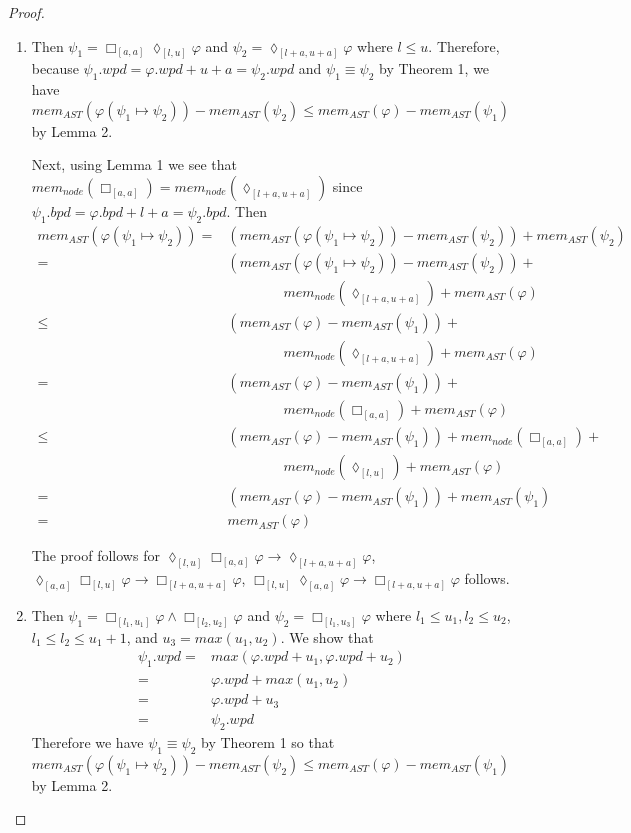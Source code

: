 \documentclass{article}
\begin{document}
\begin{proof}
\begin{enumerate}
    \item[(R3):] Then $\psi_1 = \Box_{[a,a]}{\lozenge_{[l,u]}}{\varphi}$ and $\psi_2 = \lozenge_{[l+a,u+a]}{\varphi}$ where $l \leq u$. 
Therefore, because $\psi_1.wpd = \varphi.wpd + u+a = \psi_2.wpd$ and $\psi_1 \equiv \psi_2$ by Theorem 1, we have $mem_{AST}(\varphi(\psi_1 \mapsto \psi_2)) - mem_{AST}(\psi_2)  \leq mem_{AST}(\varphi) - mem_{AST}(\psi_1)$ by Lemma 2.

Next, using Lemma 1 we see that $mem_{node}(\Box_{[a,a]}{}) = mem_{node}(\lozenge_{[l+a,u+a]}{})$ since $\psi_1.bpd = \varphi.bpd + l+a = \psi_2.bpd$. Then
\begin{align*}
mem_{AST}(\varphi(\psi_1 \mapsto \psi_2)) = & (mem_{AST}(\varphi(\psi_1 \mapsto \psi_2)) - mem_{AST}(\psi_2)) + mem_{AST}(\psi_2) \\
= & (mem_{AST}(\varphi(\psi_1 \mapsto \psi_2)) - mem_{AST}(\psi_2)) + \\
& \qquad \qquad mem_{node}(\lozenge_{[l+a,u+a]}{}) + mem_{AST}(\varphi) \\
\leq & (mem_{AST}(\varphi) - mem_{AST}(\psi_1)) + \\
& \qquad \qquad mem_{node}(\lozenge_{[l+a,u+a]}{}) + mem_{AST}(\varphi) \\
= & (mem_{AST}(\varphi) - mem_{AST}(\psi_1)) + \\
& \qquad \qquad mem_{node}(\Box_{[a,a]}{}) + mem_{AST}(\varphi) \\
\leq & (mem_{AST}(\varphi) - mem_{AST}(\psi_1)) + mem_{node}(\Box_{[a,a]}{}) + \\
& \qquad \qquad mem_{node}(\lozenge_{[l,u]}) + mem_{AST}(\varphi) \\
= & (mem_{AST}(\varphi) - mem_{AST}(\psi_1)) + mem_{AST}(\psi_1) \\
= & mem_{AST}(\varphi)
\end{align*}

The proof follows for $\lozenge_{[l,u]}{\Box_{[a,a]}}{\varphi} \rightarrow \lozenge_{[l+a,u+a]}{\varphi}$, $\lozenge_{[a,a]}{\Box_{[l,u]}}{\varphi} \rightarrow \Box_{[l+a,u+a]}{\varphi} $, $\Box_{[l,u]}{\lozenge_{[a,a]}}{\varphi} \rightarrow \Box_{[l+a,u+a]}{\varphi}$ follows.

    \item[(R4):]Then $\psi_1 = \Box_{[l_1,u_1]}{\varphi} \land \Box_{[l_2,u_2]}{\varphi}$ and $\psi_2 = \Box_{[l_1,u_3]}{\varphi}$ where $l_1 \leq u_1, l_2 \leq u_2$, $l_1 \leq l_2 \leq u_1+1$, and $u_3 = max(u_1,u_2)$. 
We show that 
\begin{align*}
\psi_1.wpd = & max(\varphi.wpd + u_1, \varphi.wpd + u_2) \\
= & \varphi.wpd + max(u_1,u_2) \\
= & \varphi.wpd + u_3 \\
= & \psi_2.wpd
\end{align*}
Therefore we have $\psi_1 \equiv \psi_2$ by Theorem 1 so that $mem_{AST}(\varphi(\psi_1 \mapsto \psi_2)) - mem_{AST}(\psi_2)  \leq mem_{AST}(\varphi) - mem_{AST}(\psi_1)$ by Lemma 2.


\end{enumerate}
\end{proof}
\end{document}
